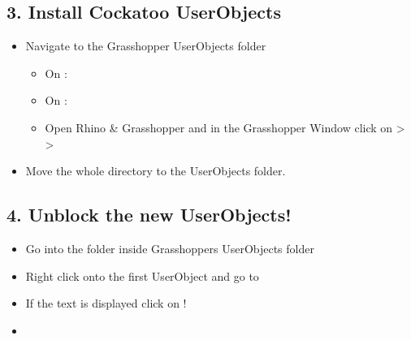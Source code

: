 \documentclass[letterpaper,10pt,english]{sphinxmanual}
\begin{document}
\subsection{3. Install Cockatoo UserObjects}
\label{\detokenize{README:install-cockatoo-userobjects}}\label{\detokenize{README:id4}}\begin{itemize}
\item {} 
Navigate to the Grasshopper UserObjects folder
\begin{itemize}
\item {} 
On :

\item {} 
On :

\item {} 
 Open Rhino \& Grasshopper and in the Grasshopper
Window click on  \textgreater{}  \textgreater{}

\end{itemize}

\item {} 
Move the whole  directory to the UserObjects folder.

\end{itemize}


\subsection{4. Unblock the new UserObjects!}
\label{\detokenize{README:unblock-the-new-userobjects}}\label{\detokenize{README:id5}}\begin{itemize}
\item {} 
Go into the  folder inside Grasshoppers UserObjects
folder

\item {} 
Right click onto the first UserObject and go to 

\item {} 
If the text  is displayed
click on !

\item {} 

\end{itemize}
\end{document}
